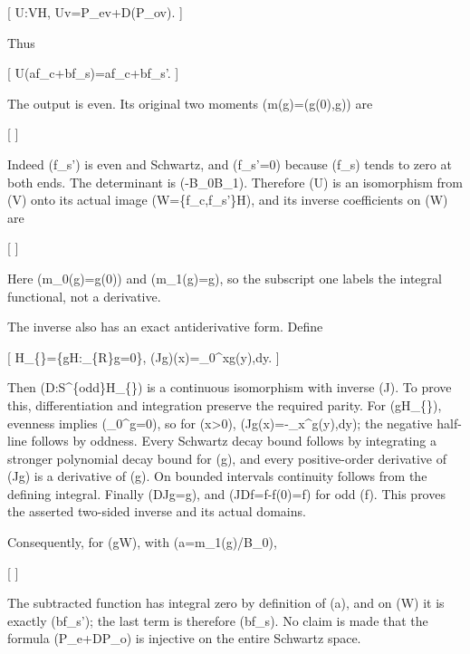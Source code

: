 \documentclass[
]{article}
\begin{document}
{[} U:V\longrightarrow\mathcal H, \qquad Uv=P\_ev+D(P\_ov). 
{]}

Thus

{[} U(af\_c+bf\_s)=af\_c+bf\_s'. {]}

The output is even. Its original two moments (m(g)=(g(0),\int g)) are

{[}   {]}

Indeed (f\_s') is even and Schwartz, and (\int f\_s'=0) because (f\_s)
tends to zero at both ends. The determinant is (-B\_0B\_1).
Therefore (U) is an isomorphism from (V) onto its actual image
(W=\{f\_c,f\_s'\}\subset\mathcal H), and its inverse
coefficients on (W) are

{[}   {]}

Here (m\_0(g)=g(0)) and (m\_1(g)=\int g), so the subscript one labels
the integral functional, not a derivative.

The inverse also has an exact antiderivative form. Define

{[} \mathcal H\_\{\}=\{g\in\mathcal H:\int\_\{\mathbb R\}g=0\},
\qquad (Jg)(x)=\int\_0\^{}xg(y),dy. {]}

Then (D:\mathcal S\^{}\{\rm odd\}\to\mathcal H\_\{\}) is a
continuous isomorphism with inverse (J). To prove this, differentiation
and integration preserve the required parity. For
(g\in\mathcal H\_\{\}), evenness implies (\int\_0\^{}\infty g=0),
so for (x\textgreater0), (Jg(x)=-\int\_x\^{}\infty g(y),dy); the
negative half-line follows by oddness. Every Schwartz decay bound
follows by integrating a stronger polynomial decay bound for (g), and
every positive-order derivative of (Jg) is a derivative of (g). On
bounded intervals continuity follows from the defining integral. Finally
(DJg=g), and (JDf=f-f(0)=f) for odd (f). This proves the asserted
two-sided inverse and its actual domains.

Consequently, for (g\in W), with (a=m\_1(g)/B\_0),

{[}   {]}

The subtracted function has integral zero by definition of (a), and on
(W) it is exactly (bf\_s'); the last term is therefore (bf\_s). No claim
is made that the formula (P\_e+DP\_o) is injective on the entire
Schwartz space.
\end{document}
